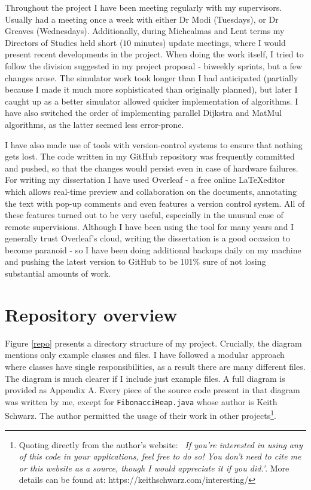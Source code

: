 \documentclass[12pt,a4paper,oneside,openright]{report}
\begin{document}
Throughout the project I have been meeting regularly with my supervisors. Usually had a meeting once a week with either Dr Modi (Tuesdays), or Dr Greaves (Wednesdays). Additionally, during Michealmas and Lent terms my Directors of Studies held short ($10$ minutes) update meetings, where I would present recent developments in the project. When doing the work itself, I tried to follow the division suggested in my project proposal - biweekly sprints, but a few changes arose. The simulator work took longer than I had anticipated (partially because I made it much more sophisticated than originally planned), but later I caught up as a better simulator allowed quicker implementation of algorithms. I have also switched the order of implementing parallel Dijkstra and MatMul algorithms, as the latter seemed less  error-prone.  

I have also made use of tools with version-control systems to ensure that nothing gets lost. The code written in my GitHub repository was frequently committed and pushed, so that the changes would persist even in case of hardware failures. For writing my dissertation I have used Overleaf - a free online \LaTeX editor which allows real-time preview and collaboration on the documents, annotating the text with pop-up comments and even features a version control system. All of these features turned out to be very useful, especially in the unusual case of remote supervisions. Although I have been using the tool for many years and I generally trust Overleaf's cloud, writing the dissertation is a good occasion to become paranoid - so I have been doing additional backups daily on my machine and pushing the latest version to GitHub to be 101\% sure of not losing substantial amounts of work.

\section{Repository overview}
Figure \ref{repo} presents a directory structure of my project. Crucially, the diagram mentions only example classes and files. I have followed a modular approach where classes have single responsibilities, as a result there are many different files. The diagram is much clearer if I include just example files. A full diagram is provided as Appendix A. Every piece of the source code present in that diagram was written by me, except for \texttt{FibonacciHeap.java} whose author is Keith Schwarz. The author permitted the usage of their work in other projects\footnote{Quoting directly from the author's website: \textit{~If you're interested in using any of this code in your applications, feel free to do so! You don't need to cite me or this website as a source, though I would appreciate it if you did.'}. More details can be found at: https://keithschwarz.com/interesting/}. 
\end{document}
